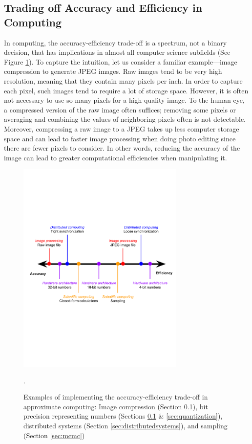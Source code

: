 \documentclass[sigplan,screen]{acmart}
\begin{document}
\subsection{Trading off Accuracy and Efficiency in Computing} \label{sec:approximatecomputing}
In computing, the accuracy-efficiency trade-off is a spectrum, not a binary decision, that has implications in almost all computer science subfields (See Figure \ref{fig:tradeoff}). To capture the intuition, let us consider a familiar example---image compression to generate JPEG images. Raw images tend to be very high resolution, meaning that they contain many pixels per inch. In order to capture each pixel, such images tend to require a lot of storage space. However, it is often not necessary to use so many pixels for a high-quality image. To the human eye, a compressed version of the raw image often suffices; removing some pixels or averaging and combining the values of neighboring pixels often is not detectable. Moreover, compressing a raw image to a JPEG takes up less computer storage space and can lead to faster image processing when doing photo editing since there are fewer pixels to consider. In other words, reducing the accuracy of the image can lead to greater computational efficiencies when manipulating it.

\begin{figure}[h]
	\includegraphics[width=8.25cm]{figs/accuracyefficiencytradeoff_cropped.pdf}
	\caption{Examples of implementing the accuracy-efficiency trade-off in approximate computing: \color{red}Image compression \color{black} (Section \ref{sec:approximatecomputing}), \color{violet}bit precision representing numbers \color{black}(Sections \ref{sec:approximatecomputing} \& \ref{sec:quantization}), \color{blue}distributed systems \color{black}(Section \ref{sec:distributedsystems}), and \color{orange}sampling \color{black}(Section \ref{sec:mcmc})}.
	\label{fig:tradeoff}
\end{figure}
\end{document}
